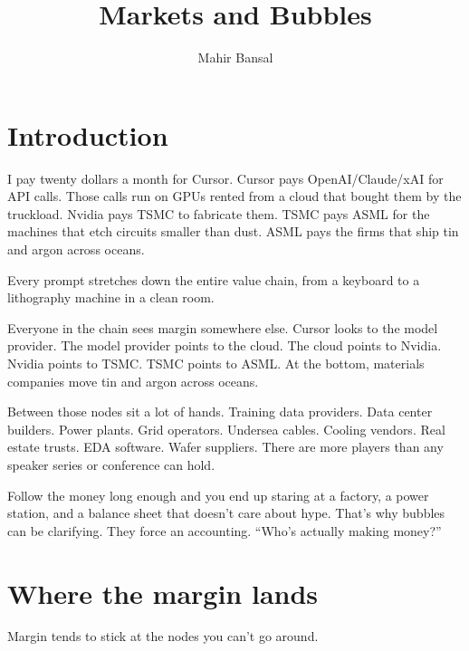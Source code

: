 \documentclass[12pt,letterpaper]{article}
\title{\Huge\textbf{Markets and Bubbles}}
\author{Mahir Bansal}
\date{}
\begin{document}
\maketitle

\vspace{2cm}

\section*{Introduction}

I pay twenty dollars a month for Cursor. Cursor pays OpenAI/Claude/xAI for API calls. Those calls run on GPUs rented from a cloud that bought them by the truckload. Nvidia pays TSMC to fabricate them. TSMC pays ASML for the machines that etch circuits smaller than dust. ASML pays the firms that ship tin and argon across oceans.

Every prompt stretches down the entire value chain, from a keyboard to a lithography machine in a clean room.

Everyone in the chain sees margin somewhere else. Cursor looks to the model provider. The model provider points to the cloud. The cloud points to Nvidia. Nvidia points to TSMC. TSMC points to ASML. At the bottom, materials companies move tin and argon across oceans.

Between those nodes sit a lot of hands. Training data providers. Data center builders. Power plants. Grid operators. Undersea cables. Cooling vendors. Real estate trusts. EDA software. Wafer suppliers. There are more players than any speaker series or conference can hold.

Follow the money long enough and you end up staring at a factory, a power station, and a balance sheet that doesn't care about hype. That's why bubbles can be clarifying. They force an accounting. ``Who's actually making money?''

\section{Where the margin lands}

Margin tends to stick at the nodes you can't go around.
\end{document}

